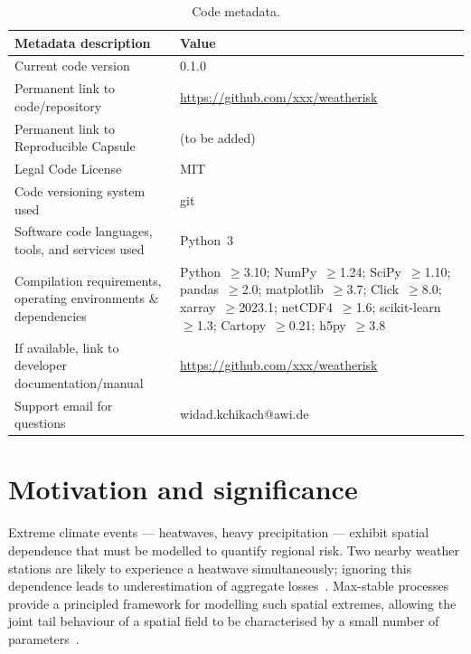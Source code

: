 \documentclass[a4paper]{elsarticle}
\begin{document}
\begin{table}[!ht]
\caption{Code metadata.}\label{tab:metadata}
\centering
\footnotesize
\begin{tabular}{@{}p{4.5cm}p{7.2cm}@{}}
\toprule
\textbf{Metadata description} & \textbf{Value} \\
\midrule
Current code version & 0.1.0 \\
Permanent link to code/repository & \url{https://github.com/xxx/weatherisk} \\
Permanent link to Reproducible Capsule & (to be added) \\
Legal Code License & MIT \\
Code versioning system used & git \\
Software code languages, tools, and services used & Python~3 \\
Compilation requirements, operating environments \& dependencies &
  Python~$\geq$3.10; NumPy~$\geq$1.24; SciPy~$\geq$1.10;
  pandas~$\geq$2.0; matplotlib~$\geq$3.7; Click~$\geq$8.0;
  xarray~$\geq$2023.1; netCDF4~$\geq$1.6;
  scikit-learn~$\geq$1.3; Cartopy~$\geq$0.21;
  h5py~$\geq$3.8 \\
If available, link to developer documentation/manual &
  \url{https://github.com/xxx/weatherisk} \\
Support email for questions & widad.kchikach@awi.de \\
\bottomrule
\end{tabular}
\end{table}

\section{Motivation and significance}
\label{sec:motivation}

Extreme climate events --- heatwaves, heavy precipitation ---
exhibit spatial dependence that must be modelled to quantify regional risk.
Two nearby weather stations are likely to experience a heatwave simultaneously;
ignoring this dependence leads to underestimation of aggregate losses~\cite{davison2012}.
Max-stable processes provide a principled framework for modelling such
spatial extremes, allowing the joint tail behaviour of a spatial field to be
characterised by a small number of parameters~\cite{dehaan2006,padoan2010}.
\end{document}
